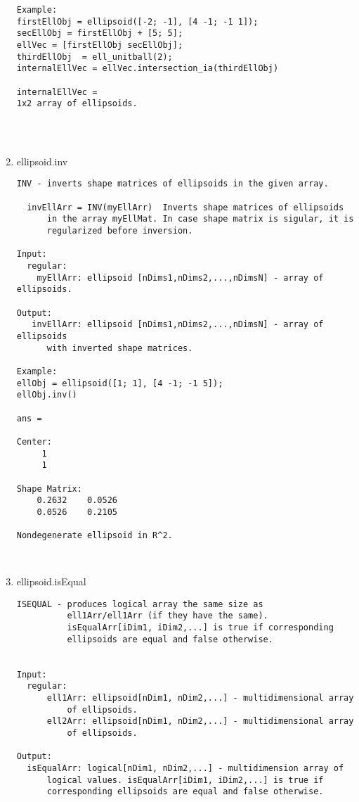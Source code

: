 \begin{enumerate}
\begin{lstlisting}
Example:
firstEllObj = ellipsoid([-2; -1], [4 -1; -1 1]);
secEllObj = firstEllObj + [5; 5];
ellVec = [firstEllObj secEllObj];
thirdEllObj  = ell_unitball(2);
internalEllVec = ellVec.intersection_ia(thirdEllObj)

internalEllVec =
1x2 array of ellipsoids.




\end{lstlisting}
\fontfamily{\familydefault}
\selectfont
\item {ellipsoid.inv}
\selectfont
\begin{lstlisting}
INV - inverts shape matrices of ellipsoids in the given array.

  invEllArr = INV(myEllArr)  Inverts shape matrices of ellipsoids
      in the array myEllMat. In case shape matrix is sigular, it is
      regularized before inversion.

Input:
  regular:
    myEllArr: ellipsoid [nDims1,nDims2,...,nDimsN] - array of ellipsoids.

Output:
   invEllArr: ellipsoid [nDims1,nDims2,...,nDimsN] - array of ellipsoids
      with inverted shape matrices.

Example:
ellObj = ellipsoid([1; 1], [4 -1; -1 5]);
ellObj.inv()

ans =

Center:
     1
     1

Shape Matrix:
    0.2632    0.0526
    0.0526    0.2105

Nondegenerate ellipsoid in R^2.



\end{lstlisting}
\fontfamily{\familydefault}
\selectfont
\item {ellipsoid.isEqual}
\selectfont
\begin{lstlisting}
ISEQUAL - produces logical array the same size as
          ell1Arr/ell1Arr (if they have the same).
          isEqualArr[iDim1, iDim2,...] is true if corresponding
          ellipsoids are equal and false otherwise.


Input:
  regular:
      ell1Arr: ellipsoid[nDim1, nDim2,...] - multidimensional array
          of ellipsoids.
      ell2Arr: ellipsoid[nDim1, nDim2,...] - multidimensional array
          of ellipsoids.

Output:
  isEqualArr: logical[nDim1, nDim2,...] - multidimension array of
      logical values. isEqualArr[iDim1, iDim2,...] is true if
      corresponding ellipsoids are equal and false otherwise.


\end{lstlisting}
\end{enumerate}
